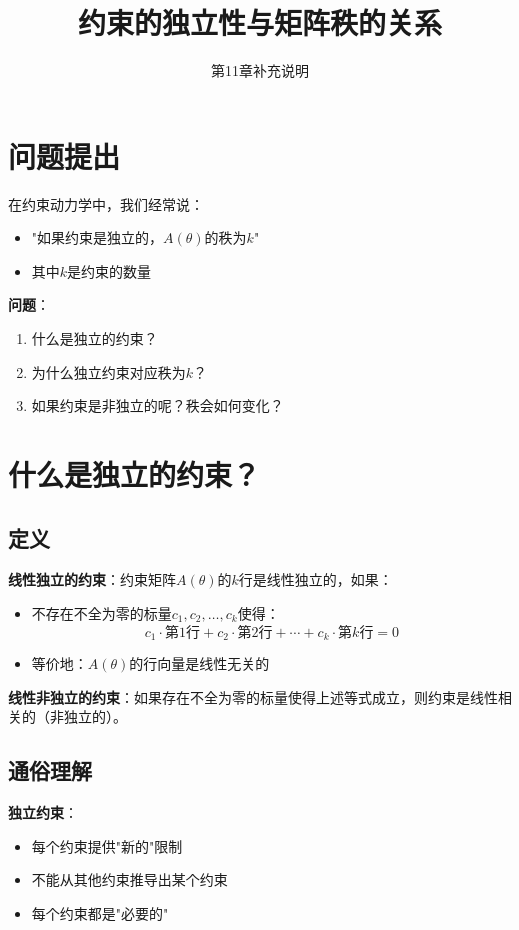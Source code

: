 \documentclass[12pt,a4paper]{article}
\title{约束的独立性与矩阵秩的关系}
\author{第11章补充说明}
\date{}
\begin{document}
\maketitle

\section{问题提出}

在约束动力学中，我们经常说：
\begin{itemize}
\item "如果约束是独立的，$A(\theta)$的秩为$k$"
\item 其中$k$是约束的数量
\end{itemize}

\textbf{问题}：
\begin{enumerate}
\item 什么是独立的约束？
\item 为什么独立约束对应秩为$k$？
\item 如果约束是非独立的呢？秩会如何变化？
\end{enumerate}

\section{什么是独立的约束？}

\subsection{定义}

\textbf{线性独立的约束}：约束矩阵$A(\theta)$的$k$行是线性独立的，如果：
\begin{itemize}
\item 不存在不全为零的标量$c_1, c_2, \ldots, c_k$使得：
\begin{equation}
c_1 \cdot \text{第1行} + c_2 \cdot \text{第2行} + \cdots + c_k \cdot \text{第$k$行} = 0
\end{equation}
\item 等价地：$A(\theta)$的行向量是线性无关的
\end{itemize}

\textbf{线性非独立的约束}：如果存在不全为零的标量使得上述等式成立，则约束是线性相关的（非独立的）。

\subsection{通俗理解}

\textbf{独立约束}：
\begin{itemize}
\item 每个约束提供"新的"限制
\item 不能从其他约束推导出某个约束
\item 每个约束都是"必要的"
\end{itemize}
\end{document}
